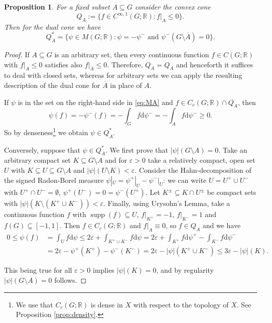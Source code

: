 \documentclass[[a4paper,english,12pt]{amsart}
\theoremstyle{plain}
\newtheorem{proposition}[theorem]{Proposition}
\theoremstyle{remark}
\newcommand\supp{\operatorname{supp}}
\newcommand{\RR}{\mathbb R}
\newcommand{\oA}{\overline{A}}
\def\veps{\varepsilon}
\def\dd{\mathrm{d}}
\begin{document}
\label{sec:dualcones}
\begin{proposition}\label{prop:Mdual}
For a fixed subset $A\subseteq G$ consider the convex cone
	\[
	Q_A:=\{f\in C^{\infty,1}(G;\RR):f|_A\leq 0\}.
	\]
Then for the dual cone we have
	\begin{equation}\label{eq:MA}
	Q_A^*=\{\psi\in M(G; \RR):\psi=-\psi^-\text{ and $\psi^-(G\setminus \oA)=0$}\}.
	\end{equation}
\end{proposition}
\begin{proof}
If $A\subseteq  G$ is an arbitrary set, then every continuous function $f\in C(G;\RR)$ with $f|_A \le 0$ satisfies also $f|_{\overline{A}}\le 0$.
Therefore, $Q_A=Q_{\oA}$ and henceforth it suffices to deal with closed sets, whereas for arbitrary sets we can apply the resulting description of the dual cone for $\overline{A}$ in place of $A$.

If $\psi$ is in the set on the right-hand side in \eqref{eq:MA} and $f\in C_c(G;\RR)\cap Q_A$, then	
\[
\psi(f)=-\psi^-(f)=-\int_G f\dd\psi^-=-\int_A f\dd\psi^-\geq 0.
\]
So by denseness\footnote{We use that $C_c(G;\RR)$ is dense in $X$ with respect to the topology of $X$. See Proposition \ref{prop:density}.} we obtain $\psi\in Q_A^*$.

\medskip\noindent
Conversely, suppose that $\psi\in 	Q_A^*$. We first prove that $|\psi|(G\setminus A)=0$.
Take an arbitrary compact set $K\subseteq G\setminus A$ and  for $\veps>0$ take a relatively compact, open  set $U$ with $K\subseteq U\subseteq G\setminus A$ and $|\psi|(U\setminus K)<\veps$. Consider the Hahn-decomposition of the signed Radon-Borel measure $\psi|_U=\psi^+|_U-\psi^-|_U$: we can write $U=U^+\cup U^-$ with $U^+\cap U^-=\emptyset$, $\psi^+(U^-)=0=\psi^-(U^+)$. Let $K^{\pm} \subseteq K \cap U^{\pm}$ be compact sets with $|\psi|(K\setminus (K^+\cup K^-))<\veps$. Finally, using Urysohn's Lemma, take a continuous function $f$ with $\supp (f)\subseteq U$, $f|_{K^+}=-1$, $f|_{K^-}=1$ and $f(G)\subseteq [-1,1]$. Then $f\in C_c(G;\RR)$ and $f|_{A} \equiv 0$, so $f\in Q_A$ and we have
\begin{align*}
0\leq \psi(f)&=\int_U f\dd\psi \leq 2 \veps+\int_{K^+ \cup K^-} f\dd\psi = 2\veps+\int_{K^+} f\dd\psi^+-\int_{K^-}f \dd\psi^-\\
&= 2\varepsilon-\psi^+(K^+)-\psi^{-}(K^-) = 2\varepsilon-|\psi|(K^+\cup K^-)\leq 3\varepsilon-|\psi|(K).
\end{align*}

\noindent This being true for all $\veps >0$ implies $|\psi|(K)=0$, and by regularity $|\psi|(G\setminus A)=0$ follows.


\end{proof}
\end{document}
